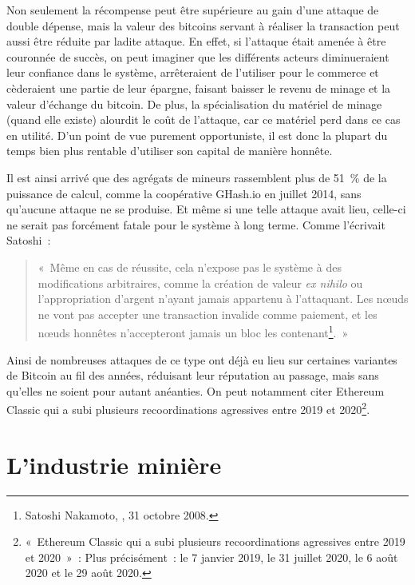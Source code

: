 Non seulement la récompense peut être supérieure au gain d'une attaque de double dépense, mais la valeur des bitcoins servant à réaliser la transaction peut aussi être réduite par ladite attaque. En effet, si l'attaque était amenée à être couronnée de succès, on peut imaginer que les différents acteurs diminueraient leur confiance dans le système, arrêteraient de l'utiliser pour le commerce et cèderaient une partie de leur épargne, faisant baisser le revenu de minage et la valeur d'échange du bitcoin. De plus, la spécialisation du matériel de minage (quand elle existe) alourdit le coût de l'attaque, car ce matériel perd dans ce cas en utilité. D'un point de vue purement opportuniste, il est donc la plupart du temps bien plus rentable d'utiliser son capital de manière honnête.

Il est ainsi arrivé que des agrégats de mineurs rassemblent plus de 51~\% de la puissance de calcul, comme la coopérative GHash.io en juillet 2014, sans qu'aucune attaque ne se produise. Et même si une telle attaque avait lieu, celle-ci ne serait pas forcément fatale pour le système à long terme. Comme l'écrivait Satoshi~:

\begin{quote}
«~Même en cas de réussite, cela n'expose pas le système à des modifications arbitraires, comme la création de valeur \emph{ex nihilo} ou l'appropriation d'argent n'ayant jamais appartenu à l'attaquant. Les nœuds ne vont pas accepter une transaction invalide comme paiement, et les nœuds honnêtes n'accepteront jamais un bloc les contenant\footnote{Satoshi Nakamoto, , 31 octobre 2008.}.~»
\end{quote}

Ainsi de nombreuses attaques de ce type ont déjà eu lieu sur certaines variantes de Bitcoin au fil des années, réduisant leur réputation au passage, mais sans qu'elles ne soient pour autant anéanties. On peut notamment citer Ethereum Classic qui a subi plusieurs recoordinations agressives entre 2019 et 2020\footnote{«~Ethereum Classic qui a subi plusieurs recoordinations agressives entre 2019 et 2020~»~: Plus précisément~: le 7 janvier 2019, le 31 juillet 2020, le 6 août 2020 et le 29 août 2020.}.

\vspace{-1em}
\section*{L'industrie minière}

